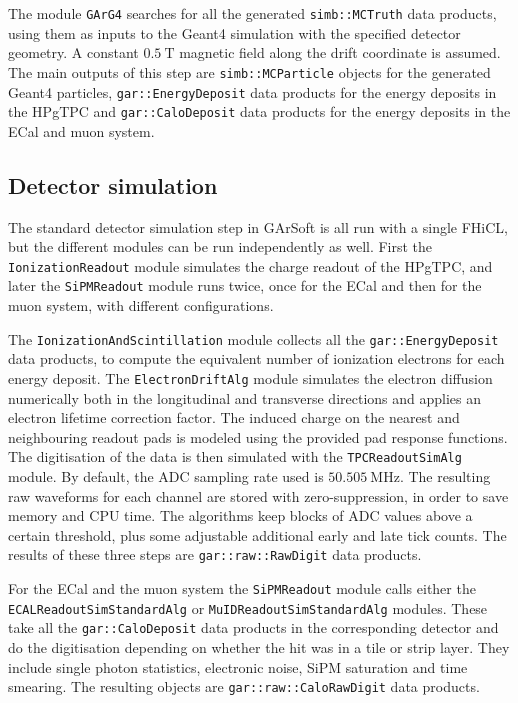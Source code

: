 The module \texttt{GArG4} searches for all the generated \texttt{simb::MCTruth} data products, using them as inputs to the Geant4 simulation with the specified detector geometry. A constant $0.5~\mathrm{T}$ magnetic field along the drift coordinate is assumed. The main outputs of this step are \texttt{simb::MCParticle} objects for the generated Geant4 particles, \texttt{gar::EnergyDeposit} data products for the energy deposits in the HPgTPC and \texttt{gar::CaloDeposit} data products for the energy deposits in the ECal and muon system.

\subsection{Detector simulation}

The standard detector simulation step in GArSoft is all run with a single FHiCL, but the different modules can be run independently as well. First the \texttt{IonizationReadout} module simulates the charge readout of the HPgTPC, and later the \texttt{SiPMReadout} module runs twice, once for the ECal and then for the muon system, with different configurations.

The \texttt{IonizationAndScintillation} module collects all the \texttt{gar::EnergyDeposit} data products, to compute the equivalent number of ionization electrons for each energy deposit. The \texttt{ElectronDriftAlg} module simulates the electron diffusion numerically both in the longitudinal and transverse directions and applies an electron lifetime correction factor. The induced charge on the nearest and neighbouring readout pads is modeled using the provided pad response functions. The digitisation of the data is then simulated with the \texttt{TPCReadoutSimAlg} module. By default, the ADC sampling rate used is $50.505~\mathrm{MHz}$. The resulting raw waveforms for each channel are stored with zero-suppression, in order to save memory and CPU time. The algorithms keep blocks of ADC values above a certain threshold, plus some adjustable additional early and late tick counts. The results of these three steps are \texttt{gar::raw::RawDigit} data products.

For the ECal and the muon system the \texttt{SiPMReadout} module calls either the \texttt{ECALReadoutSimStandardAlg} or \texttt{MuIDReadoutSimStandardAlg} modules. These take all the \texttt{gar::CaloDeposit} data products in the corresponding detector and do the digitisation depending on whether the hit was in a tile or strip layer. They include single photon statistics, electronic noise, SiPM saturation and time smearing. The resulting objects are \texttt{gar::raw::CaloRawDigit} data products.

